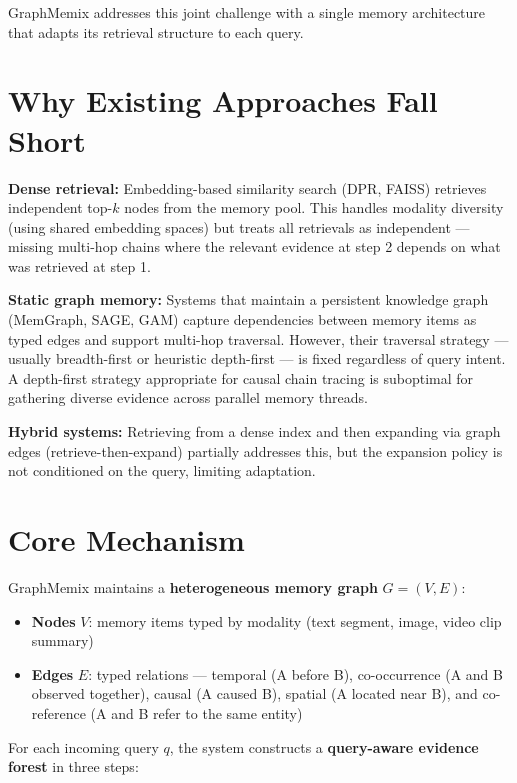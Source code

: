 \documentclass[10pt,twocolumn]{article}
\begin{document}
GraphMemix addresses this joint challenge with a single memory
architecture that adapts its retrieval structure to each query.

\section{Why Existing Approaches Fall Short}

\textbf{Dense retrieval:} Embedding-based similarity search (DPR,
FAISS) retrieves independent top-$k$ nodes from the memory pool.
This handles modality diversity (using shared embedding spaces) but
treats all retrievals as independent — missing multi-hop chains where
the relevant evidence at step 2 depends on what was retrieved at
step 1.

\textbf{Static graph memory:} Systems that maintain a persistent
knowledge graph (MemGraph, SAGE, GAM) capture dependencies between
memory items as typed edges and support multi-hop traversal. However,
their traversal strategy — usually breadth-first or heuristic
depth-first — is fixed regardless of query intent. A depth-first
strategy appropriate for causal chain tracing is suboptimal for
gathering diverse evidence across parallel memory threads.

\textbf{Hybrid systems:} Retrieving from a dense index and then
expanding via graph edges (retrieve-then-expand) partially addresses
this, but the expansion policy is not conditioned on the query,
limiting adaptation.

\section{Core Mechanism}

GraphMemix maintains a \textbf{heterogeneous memory graph}
$G = (V, E)$:

\begin{itemize}[itemsep=2pt,parsep=0pt]
  \item \textbf{Nodes} $V$: memory items typed by modality (text
    segment, image, video clip summary)
  \item \textbf{Edges} $E$: typed relations — temporal (A before B),
    co-occurrence (A and B observed together), causal (A caused B),
    spatial (A located near B), and co-reference (A and B refer
    to the same entity)
\end{itemize}

For each incoming query $q$, the system constructs a
\textbf{query-aware evidence forest} in three steps:
\end{document}
